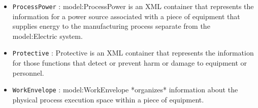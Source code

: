 \begin{itemize}
\item \texttt{ProcessPower} : {model:ProcessPower} is an XML container that represents the information for a power source associated with a piece of equipment that supplies energy to the manufacturing process separate from the {model:Electric} system.

\item \texttt{Protective} : Protective is an XML container that represents the information for those functions that detect or prevent harm or damage to equipment or personnel.

\item \texttt{WorkEnvelope} : {model:WorkEnvelope} *organizes* information about the physical process execution space within a piece of equipment.

\end{itemize}

\FloatBarrier
